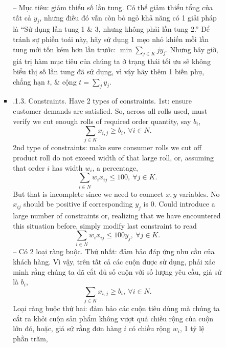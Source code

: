 \documentclass{article}
\begin{document}
\begin{itemize}
\begin{itemize}
\begin{itemize}
\begin{itemize}
                -- Mục tiêu: giảm thiểu số lần tung. Có thể giảm thiểu tổng của tất cả $y_j$, nhưng điều đó vẫn còn bỏ ngỏ khả năng có 1 giải pháp là ``Sử dụng lần tung 1 \& 3, nhưng không phải lần tung 2.'' Để tránh sự phiền toái này, hãy sử dụng 1 mẹo nhỏ khiến mỗi lần tung mới tốn kém hơn lần trước: $\min\sum_{j\in K} jy_j$. Nhưng bây giờ, giá trị hàm mục tiêu của chúng ta ở trạng thái tối ưu sẽ không biểu thị số lần tung đã sử dụng, vì vậy hãy thêm 1 biến phụ, chẳng hạn $t$, \& cộng $t = \sum_j y_j$.
                \item {.1.3. Constraints.} Have 2 types of constraints. 1st: ensure customer demands are satisfied. So, across all rolls used, must verify we cut enough rolls of required order quantity, say $b_i$,
                \begin{equation*}
                    \sum_{j\in K} x_{i,j}\ge b_i,\ \forall i\in N.
                \end{equation*}
                2nd type of constraints: make sure consumer rolls we cut off product roll do not exceed width of that large roll, or, assuming that order $i$ has width $w_i$, a percentage,
                \begin{equation*}
                    \sum_{i\in N} w_ix_{ij}\le100,\ \forall j\in K.
                \end{equation*}
                But that is incomplete since we need to connect $x,y$ variables. No $x_{ij}$ should be positive if corresponding $y_j$ is 0. Could introduce a large number of constraints or, realizing that we have encountered this situation before, simply modify last constraint to read
                \begin{equation*}
                    \sum_{i\in N} w_ix_{ij}\le100y_j,\ \forall j\in K.
                \end{equation*}
                -- Có 2 loại ràng buộc. Thứ nhất: đảm bảo đáp ứng nhu cầu của khách hàng. Vì vậy, trên tất cả các cuộn được sử dụng, phải xác minh rằng chúng ta đã cắt đủ số cuộn với số lượng yêu cầu, giả sử là $b_i$,
                \begin{equation*}
                    \sum_{j\in K} x_{i,j}\ge b_i,\ \forall i\in N.
                \end{equation*}
                Loại ràng buộc thứ hai: đảm bảo các cuộn tiêu dùng mà chúng ta cắt ra khỏi cuộn sản phẩm không vượt quá chiều rộng của cuộn lớn đó, hoặc, giả sử rằng đơn hàng $i$ có chiều rộng $w_i$, 1 tỷ lệ phần trăm,
                \begin{equation*}

\end{equation*}
\end{itemize}
\end{itemize}
\end{itemize}
\end{itemize}
\end{document}
